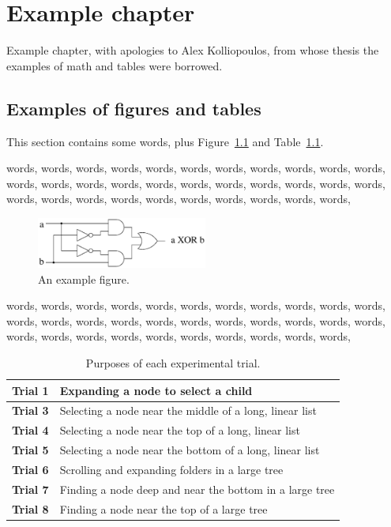 %
%
\chapter{Example chapter}

Example chapter, with apologies to Alex Kolliopoulos,
from whose thesis the examples of math and tables were
borrowed.

\section{Examples of figures and tables}
\label{section:example-figtbl}

This section contains some words, plus
Figure~\ref{fig:xor} and 
Table~\ref{table:treepurpose}.

words, words, words, words,
words, words, words, words,
words, words, words, words,
words, words, words, words,
words, words, words, words,
words, words, words, words,
words, words, words, words,
words, words, words, words,

\begin{figure}[hbtp]
\begin{center}
\includegraphics[width=0.5\textwidth]{xor}
\end{center}
\caption{An example figure.}
\label{fig:xor}
\end{figure}

words, words, words, words,
words, words, words, words,
words, words, words, words,
words, words, words, words,
words, words, words, words,
words, words, words, words,
words, words, words, words,
words, words, words, words,

\begin{table}[hbtp]
\begin{tabular}{|l|l|}
\hline 
\textbf{Trial 1} & Expanding a node to select a child\\
\hline
\textbf{Trial 3} & Selecting a node near the middle of a long, linear list\\
\hline
\textbf{Trial 4} & Selecting a node near the top of a long, linear list\\
\hline
\textbf{Trial 5} & Selecting a node near the bottom of a long, linear list\\
\hline
\textbf{Trial 6} & Scrolling and expanding folders in a large tree\\
\hline
\textbf{Trial 7} & Finding a node deep and near the bottom in a large tree\\
\hline
\textbf{Trial 8} & Finding a node near the top of a large tree\\
\hline
\end{tabular}
\caption{Purposes of each experimental trial.}
\label{table:treepurpose}
\end{table}
